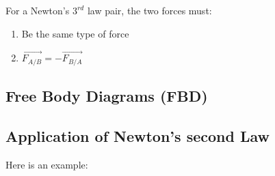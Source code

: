 For a Newton's $3^{rd}$ law pair, the two forces must:
\begin{enumerate}
    \item Be the same type of force
    \item $\vec{F_{A/B}} = -\vec{F_{B/A}}$
\end{enumerate}
\newpage
\subsection{Free Body Diagrams (FBD)}

\subsection{Application of Newton's second Law}
Here is an example:
